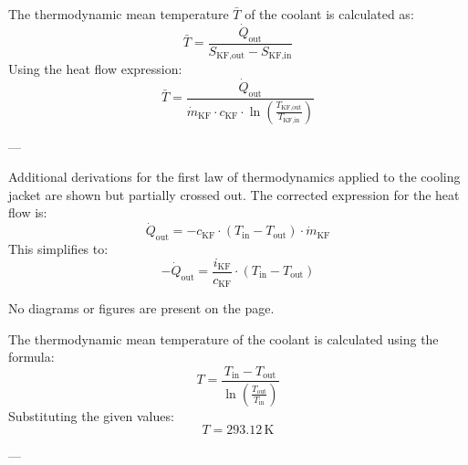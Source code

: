 The thermodynamic mean temperature \( \bar{T} \) of the coolant is calculated as:  
\[
\bar{T} = \frac{\dot{Q}_{\text{out}}}{S_{\text{KF,out}} - S_{\text{KF,in}}}
\]  
Using the heat flow expression:  
\[
\bar{T} = \frac{\dot{Q}_{\text{out}}}{\dot{m}_{\text{KF}} \cdot c_{\text{KF}} \cdot \ln\left(\frac{T_{\text{KF,out}}}{T_{\text{KF,in}}}\right)}
\]  

---

Additional derivations for the first law of thermodynamics applied to the cooling jacket are shown but partially crossed out. The corrected expression for the heat flow is:  
\[
\dot{Q}_{\text{out}} = -c_{\text{KF}} \cdot (T_{\text{in}} - T_{\text{out}}) \cdot \dot{m}_{\text{KF}}
\]  
This simplifies to:  
\[
-\dot{Q}_{\text{out}} = \frac{i_{\text{KF}}}{c_{\text{KF}}} \cdot (T_{\text{in}} - T_{\text{out}})
\]  

No diagrams or figures are present on the page.

The thermodynamic mean temperature of the coolant is calculated using the formula:  
\[
T = \frac{T_{\text{in}} - T_{\text{out}}}{\ln\left(\frac{T_{\text{out}}}{T_{\text{in}}}\right)}
\]  
Substituting the given values:  
\[
T = 293.12 \, \text{K}
\]  

---